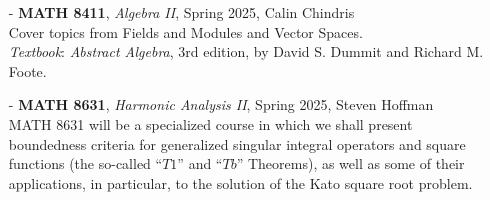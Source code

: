 \documentclass{article}
\begin{document}
\begin{enumerate}
    \item[-] \textbf{MATH 8411}, \textit{Algebra II}, Spring 2025, Calin Chindris\\
    Cover topics from Fields and Modules and Vector Spaces. \\
    \textit{Textbook}: \textit{Abstract Algebra}, 3rd edition, by David S. Dummit and Richard M. Foote.

    \item[-] \textbf{MATH 8631}, \textit{Harmonic Analysis II}, Spring 2025, Steven Hoffman\\
    MATH 8631 will be a specialized course in which we shall present boundedness criteria for generalized singular integral operators and square functions (the so-called ``$T1$'' and ``$Tb$'' Theorems), as well as some of their applications, in particular, to the solution of the Kato square root problem. 
\end{enumerate}
\end{document}
